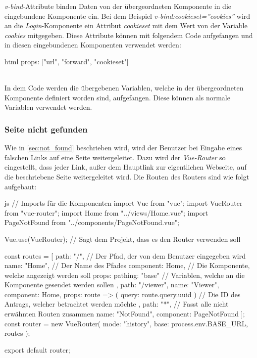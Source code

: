 \textit{v-bind}-Attribute binden Daten von der übergeordneten Komponente in die eingebundene Komponente ein. Bei dem Beispiel \textit{v-bind:cookieset=''cookies''} wird an die \textit{Login}-Komponente ein Attribut \textit{cookieset} mit dem Wert von der Variable \textit{cookies} mitgegeben.
Diese Attribute können mit folgendem Code aufgefangen und in diesen eingebundenen Komponenten verwendet werden:
\begin{code}{html}
		props: ["url", "forward", "cookieset"]
\end{code}
~\\
In dem Code werden die übergebenen Variablen, welche in der übergeordneten Komponente definiert worden sind, aufgefangen. Diese können als normale Variablen verwendet werden.
\newpage
\subsubsection{Seite nicht gefunden}
Wie in \autoref{sec:not_found} beschrieben wird, wird der Benutzer bei Eingabe eines falschen Links auf eine Seite weitergeleitet. Dazu wird der \textit{Vue-Router} so eingestellt, dass jeder Link, außer dem Hauptlink zur eigentlichen Webseite, auf die beschriebene Seite weitergeleitet wird. Die Routen des Routers sind wie folgt aufgebaut:
\begin{code}{js}
// Imports für die Komponenten
import Vue from "vue";
import VueRouter from "vue-router";
import Home from "../views/Home.vue";
import PageNotFound from "../components/PageNotFound.vue";

Vue.use(VueRouter);		// Sagt dem Projekt, dass es den Router verwenden soll

const routes = [
{
	path: "/",					// Der Pfad, der von dem Benutzer eingegeben wird
	name: "Home",				// Der Name des Pfades
	component: Home,			// Die Komponente, welche angezeigt werden soll
	props: { pathing: "base" }	// Variablen, welche an die Komponente gesendet werden sollen
},
{
	path: "/viewer",
	name: "Viewer",
	component: Home,
	props: route => ({ query: route.query.uuid })	// Die ID des Antrags, welcher betrachtet werden möchte
},
{
	path: "*",				// Fasst alle nicht erwähnten Routen zusammen
	name: "NotFound",
	component: PageNotFound
}
];
const router = new VueRouter({
	mode: "history",
	base: process.env.BASE_URL,
	routes
});

export default router;
\end{code}
~\\


